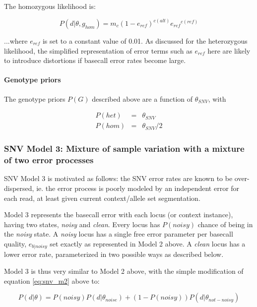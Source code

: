 \documentclass{article}
\begin{document}
The homozygous likelihood is:

\begin{equation*}
P (d \vert \theta, g_{hom}) = m_c (1-e_{ref})^{c(alt)} {e_{ref}}^{c(ref)}
\end{equation*}

...where $e_{ref}$ is set to a constant value of 0.01. As discussed for the heterozygous likelihood, the simplified representation of error terms such as $e_{ref}$ here are likely to introduce distortions if basecall error rates become large.


\paragraph{Genotype priors}

The genotype priors $P(G)$ described above are a function of $\theta_{SNV}$, with

\begin{eqnarray*}
P(het) &=& \theta_{SNV} \\
P(hom) &=& \theta_{SNV} / 2
\end{eqnarray*}


\subsubsection{SNV Model 3: Mixture of sample variation with a mixture of two error processes}

SNV Model 3 is motivated as follows: the SNV error rates are known to be over-dispersed, ie. the error process is poorly modeled by an independent error for each read, at least given current context/allele set segmentation.

Model 3 represents the basecall error with each locus (or context instance), having two states, \emph{noisy} and \emph{clean}. Every locus has $P(noisy)$ chance of being in the \emph{noisy} state. A \emph{noisy} locus has a single free error parameter per basecall quality, $e_{b|noisy}$ set exactly as represented in Model 2 above. A \emph{clean} locus has a lower error rate, parameterized in two possible ways as described below.

Model 3 is thus very similar to Model 2 above, with the simple modification of equation \ref{eq:snv_m2} above to:

\begin{equation*}
P(d \vert \theta) = P(noisy) P (d \vert \theta_{noise}) + (1-P(noisy)) P (d \vert \theta_{not-noisy})
\end{equation*}
\end{document}
